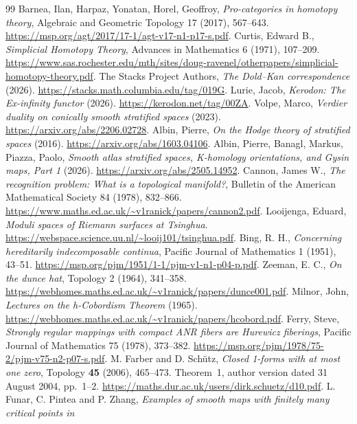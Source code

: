 \documentclass[11pt,a4paper]{article}
\theoremstyle{definition}
\begin{document}
\begin{thebibliography}{99}
 Barnea, Ilan, Harpaz, Yonatan, Horel, Geoffroy, \emph{Pro-categories in homotopy theory}, Algebraic and Geometric Topology 17 (2017), 567--643. \url{https://msp.org/agt/2017/17-1/agt-v17-n1-p17-s.pdf}.
 Curtis, Edward B., \emph{Simplicial Homotopy Theory}, Advances in Mathematics 6 (1971), 107--209. \url{https://www.sas.rochester.edu/mth/sites/doug-ravenel/otherpapers/simplicial-homotopy-theory.pdf}.
 {The Stacks Project Authors}, \emph{The {Dold--Kan} correspondence} (2026). \url{https://stacks.math.columbia.edu/tag/019G}.
 Lurie, Jacob, \emph{Kerodon: The {Ex-infinity} functor} (2026). \url{https://kerodon.net/tag/00ZA}.
 Volpe, Marco, \emph{Verdier duality on conically smooth stratified spaces} (2023). \url{https://arxiv.org/abs/2206.02728}.
 Albin, Pierre, \emph{On the Hodge theory of stratified spaces} (2016). \url{https://arxiv.org/abs/1603.04106}.
 Albin, Pierre, Banagl, Markus, Piazza, Paolo, \emph{Smooth atlas stratified spaces, K-homology orientations, and Gysin maps, Part 1} (2026). \url{https://arxiv.org/abs/2505.14952}.
 Cannon, James W., \emph{The recognition problem: What is a topological manifold?}, Bulletin of the American Mathematical Society 84 (1978), 832--866. \url{https://www.maths.ed.ac.uk/~v1ranick/papers/cannon2.pdf}.
 Looijenga, Eduard, \emph{Moduli spaces of Riemann surfaces at Tsinghua}. \url{https://webspace.science.uu.nl/~looij101/tsinghua.pdf}.
 Bing, R. H., \emph{Concerning hereditarily indecomposable continua}, Pacific Journal of Mathematics 1 (1951), 43--51. \url{https://msp.org/pjm/1951/1-1/pjm-v1-n1-p04-p.pdf}.
 Zeeman, E. C., \emph{On the dunce hat}, Topology 2 (1964), 341--358. \url{https://webhomes.maths.ed.ac.uk/~v1ranick/papers/dunce001.pdf}.
 Milnor, John, \emph{Lectures on the h-Cobordism Theorem} (1965). \url{https://webhomes.maths.ed.ac.uk/~v1ranick/papers/hcobord.pdf}.
 Ferry, Steve, \emph{Strongly regular mappings with compact {ANR} fibers are {Hurewicz} fiberings}, Pacific Journal of Mathematics 75 (1978), 373--382. \url{https://msp.org/pjm/1978/75-2/pjm-v75-n2-p07-s.pdf}.
 M. Farber and D. Sch\"utz,
\emph{Closed 1-forms with at most one zero}, Topology \textbf{45}
(2006), 465--473. Theorem~1, author version dated 31 August 2004,
pp.~1--2. \url{https://maths.dur.ac.uk/users/dirk.schuetz/d10.pdf}.
 L. Funar, C. Pintea and P. Zhang,
\emph{Examples of smooth maps with finitely many critical points in
}
\end{thebibliography}
\end{document}
